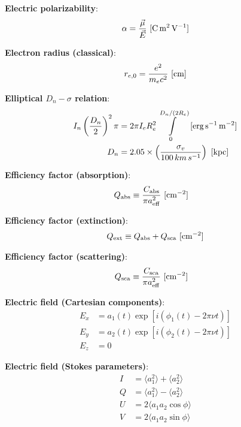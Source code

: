 \documentclass[a4paper,10pt]{article}
\begin{document}
{\noindent}\textbf{Electric polarizability}:
\begin{align*}
    \alpha = \frac{\vec{\mu}}{\vec{E}} ~ [{\rm C\,m^2\,V^{-1}}]
\end{align*}

{\noindent}\textbf{Electron radius (classical)}:
\begin{align*}
    r_{e,0} = \frac{e^2}{m_ec^2} ~ [{\rm cm}]
\end{align*}

{\noindent}\textbf{Elliptical $D_n-\sigma$ relation}:
\begin{align*}
    I_n\left(\frac{D_n}{2}\right)^2\pi &= 2\pi I_eR_e^2 \int\limits_0^{D_n/(2R_e)} ~ [{\rm erg\,s^{-1}\,m^{-2}}] \\
    D_n &= 2.05\times\left(\frac{\sigma_v}{100\,km\,s^{-1}}\right) ~ [{\rm kpc}]
\end{align*}

{\noindent}\textbf{Efficiency factor (absorption)}:
\begin{align*}
    Q_{\rm abs} &\equiv \frac{C_{\rm abs}}{\pi a_{\rm eff}^2} ~ [{\rm cm^{-2}}]
\end{align*}

{\noindent}\textbf{Efficiency factor (extinction)}:
\begin{align*}
    Q_{\rm ext} \equiv Q_{\rm abs} + Q_{\rm sca} ~ [{\rm cm^{-2}}]
\end{align*}

{\noindent}\textbf{Efficiency factor (scattering)}:
\begin{align*}
    Q_{\rm sca} &\equiv \frac{C_{\rm sca}}{\pi a_{\rm eff}^2} ~ [{\rm cm^{-2}}]
\end{align*}

{\noindent}\textbf{Electric field (Cartesian components)}:
\begin{align*}
    E_x &= a_1(t)\exp[i(\phi_1(t)-2\pi\nu t)] \\
    E_y &= a_2(t)\exp[i(\phi_2(t)-2\pi\nu t)] \\
    E_z &= 0
\end{align*}

{\noindent}\textbf{Electric field (Stokes parameters)}:
\begin{align*}
    I &= \langle{a_1^2}\rangle + \langle{a_2^2}\rangle \\
    Q &= \langle{a_1^2}\rangle - \langle{a_2^2}\rangle \\
    U &= 2\langle{a_1a_2\cos\phi}\rangle \\
    V &= 2\langle{a_1a_2\sin\phi}\rangle
\end{align*}
\end{document}
